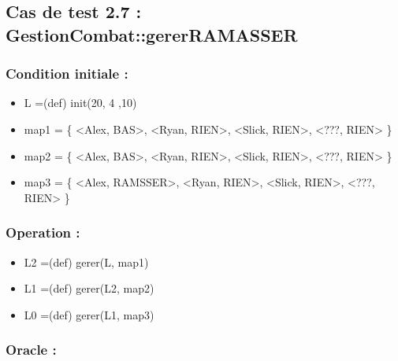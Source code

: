 \documentclass[11pt]{article}
\begin{document}
\subsection{Cas de test 2.7 : GestionCombat::gererRAMASSER}
\label{sec-1.8}

\subsubsection{Condition initiale :}
\label{sec-1.8.1}

\begin{itemize}

\item L =(def) init(20, 4 ,10)\\
\label{sec-1.8.1.1}


\item map1 = \{ <Alex, BAS>, <Ryan, RIEN>, <Slick, RIEN>, <???, RIEN> \}\\
\label{sec-1.8.1.2}


\item map2 = \{ <Alex, BAS>, <Ryan, RIEN>, <Slick, RIEN>, <???, RIEN> \}\\
\label{sec-1.8.1.3}


\item map3 = \{ <Alex, RAMSSER>, <Ryan, RIEN>, <Slick, RIEN>, <???, RIEN> \}\\
\label{sec-1.8.1.4}

\end{itemize} %
\subsubsection{Operation :}
\label{sec-1.8.2}

\begin{itemize}

\item L2 =(def) gerer(L, map1)\\
\label{sec-1.8.2.1}


\item L1 =(def) gerer(L2, map2)\\
\label{sec-1.8.2.2}


\item L0 =(def) gerer(L1, map3)\\
\label{sec-1.8.2.3}

\end{itemize} %
\subsubsection{Oracle :}
\label{sec-1.8.3}
\end{document}
